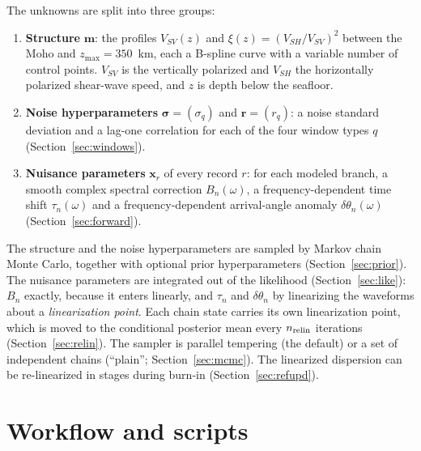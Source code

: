 \documentclass[11pt]{article}
\newcommand{\vsv}{V_{SV}}
\newcommand{\vsh}{V_{SH}}
\begin{document}
The unknowns are split into three groups:
\begin{enumerate}
\item \textbf{Structure} $\mathbf{m}$: the profiles $\vsv(z)$ and
  $\xi(z)=(\vsh/\vsv)^2$ between the Moho and $z_{\max}=350$~km, each a
  B-spline curve with a variable number of control points.
  $\vsv$ is the vertically polarized and $\vsh$ the horizontally polarized
  shear-wave speed, and $z$ is depth below the seafloor.
\item \textbf{Noise hyperparameters} $\bm{\sigma}=(\sigma_q)$ and
  $\mathbf{r}=(r_q)$: a noise standard deviation and a lag-one correlation
  for each of the four window types $q$ (Section~\ref{sec:windows}).
\item \textbf{Nuisance parameters} $\mathbf{x}_r$ of every record $r$: for
  each modeled branch, a smooth complex spectral correction $B_n(\omega)$,
  a frequency-dependent time shift $\tau_n(\omega)$ and a
  frequency-dependent arrival-angle anomaly $\delta\theta_n(\omega)$
  (Section~\ref{sec:forward}).
\end{enumerate}
The structure and the noise hyperparameters are sampled by Markov chain
Monte Carlo, together with optional prior hyperparameters
(Section~\ref{sec:prior}). The nuisance parameters are integrated out of the likelihood
(Section~\ref{sec:like}): $B_n$ exactly, because it enters linearly, and
$\tau_n$ and $\delta\theta_n$ by linearizing the waveforms about a
\emph{linearization point}. Each chain state carries its own linearization
point, which is moved to the conditional posterior mean every
$n_{\rm relin}$ iterations (Section~\ref{sec:relin}). The sampler is
parallel tempering (the default) or a set of independent chains
(``plain''; Section~\ref{sec:mcmc}). The linearized dispersion can be re-linearized in
stages during burn-in (Section~\ref{sec:refupd}).

\section{Workflow and scripts}\label{sec:workflow}
\end{document}
